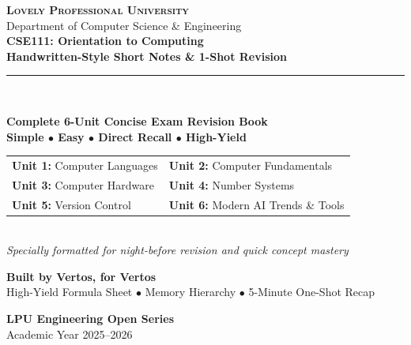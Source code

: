 \documentclass[a4paper,11pt]{article}
\begin{document}
\begin{titlepage}
\pagecolor{DeepNavy}
\color{white}
\vspace*{1cm}

\begin{center}
    {\LARGE \bfseries \scshape Lovely Professional University}\\[3mm]
    {\small Department of Computer Science \& Engineering}\\[12mm]

    {\Huge \bfseries CSE111: Orientation to Computing}\\[6mm]
    {\LARGE \bfseries Handwritten-Style Short Notes \& 1-Shot Revision}\\[8mm]
    {\color{WarmAmber}\rule{0.85\textwidth}{2pt}}\\[10mm]

    \begin{tcolorbox}[enhanced, width=0.88\textwidth, colback=white, colframe=WarmAmber, boxrule=1.5pt, arc=3mm, halign=center]
        \color{DarkSlate}
        \vspace{2mm}
        {\Large\bfseries Complete 6-Unit Concise Exam Revision Book}\\[3mm]
        {\large\bfseries Simple $\bullet$ Easy $\bullet$ Direct Recall $\bullet$ High-Yield}\\[3mm]
        \begin{tabular}{ll}
            \textbf{Unit 1:} Computer Languages & \quad \textbf{Unit 2:} Computer Fundamentals \\
            \textbf{Unit 3:} Computer Hardware  & \quad \textbf{Unit 4:} Number Systems \\
            \textbf{Unit 5:} Version Control    & \quad \textbf{Unit 6:} Modern AI Trends \& Tools \\
        \end{tabular}\\[3mm]
        \textit{Specially formatted for night-before revision and quick concept mastery}
        \vspace{2mm}
    \end{tcolorbox}

    \vfill

    {\large \bfseries Built by Vertos, for Vertos}\\[2mm]
    {\small High-Yield Formula Sheet $\bullet$ Memory Hierarchy $\bullet$ 5-Minute One-Shot Recap}\\[8mm]

    \begin{tcolorbox}[width=0.55\textwidth, colback=DeepNavy!80!black, colframe=white, boxrule=0.6pt, halign=center]
        \color{white}
        \textbf{LPU Engineering Open Series}\\[1mm]
        {\footnotesize Academic Year 2025--2026}
    \end{tcolorbox}
    \vspace*{1cm}
\end{center}
\end{titlepage}
\nopagecolor
\newpage
\end{document}

